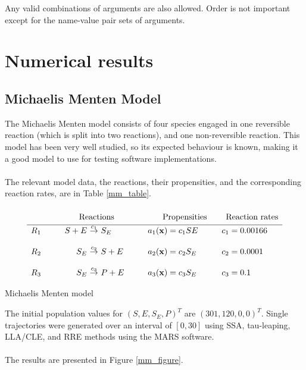 \documentclass[ugrad,lot,lof,openright,11pt,oneside,onehalfspace]{RUthesis}
\begin{document}
		\noindent
		Any valid combinations of arguments are also allowed. Order is not important except for the name-value pair sets of arguments.


\chapter{Numerical results}

	\section{Michaelis Menten Model}

		The Michaelis Menten model \cite{sim_chem_reactions} consists of four species engaged in one reversible reaction (which is split into two reactions), and one non-reversible reaction. This model has been very well studied, so its expected behaviour is known, making it a good model to use for testing software implementations.\\
		\\
		The relevant model data, the reactions, their propensities, and the corresponding reaction rates, are in Table \ref{mm_table}.

		\begin{table}[H]
		\[
		\begin{array}{l@{\hspace*{10mm}}r@{\ }c@{\ }l@{\hspace*{10mm}}l@{\hspace*{10mm}}l}
		\multicolumn{4}{c}{\text{{\huge\phantom{$I_{I_I}$}}Reactions}} & \multicolumn{1}{c}{\text{Propensities}} & \multicolumn{1}{c}{\text{Reaction rates}}\\
		\hline
		R_1 	& S + E & \stackrel{c_1}{\rightarrow} & S_E 		& a_1(\mathbf{x}) = c_1 S E 		& c_1 = 0.00166
		\\\\
		R_2 	& S_E & \stackrel{c_2}{\rightarrow} & S + E 		& a_2(\mathbf{x}) = c_2 S_E 		& c_2 = 0.0001
		\\\\
		R_3 	& S_E & \stackrel{c_3}{\rightarrow} & P + E 		& a_3(\mathbf{x}) = c_3 S_E 		& c_3 = 0.1
		\end{array}
		\]
		\captionsetup{width=0.8\textwidth}
		\caption{Michaelis Menten model}
		\label{mm_table}
		\end{table}

		\noindent
		The initial population values for $(S,E,S_E,P)^T$ are $(301,120,0,0)^T$. Single trajectories were generated over an interval of $[0,30]$ using SSA, tau-leaping, LLA/CLE, and RRE methods using the MARS software.\\
		\\
		The results are presented in Figure \ref{mm_figure}.
\end{document}
